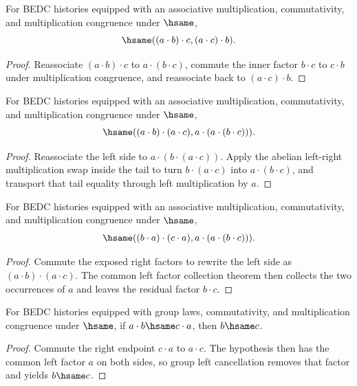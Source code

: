 \begin{theorem}
\label{thm:abgroup-mul-right-factor-swap}
For BEDC histories equipped with an associative multiplication, commutativity,
and multiplication congruence under $\hsame$,
$$
\hsame((a\cdot b)\cdot c,(a\cdot c)\cdot b).
$$
\end{theorem}
\begin{proof}
Reassociate $(a\cdot b)\cdot c$ to $a\cdot(b\cdot c)$, commute the inner
factor $b\cdot c$ to $c\cdot b$ under multiplication congruence, and reassociate
back to $(a\cdot c)\cdot b$.
\end{proof}

\begin{theorem}
\label{thm:abgroup-mul-common-left-factor-collect}
For BEDC histories equipped with an associative multiplication, commutativity,
and multiplication congruence under $\hsame$,
$$
\hsame((a\cdot b)\cdot(a\cdot c),a\cdot(a\cdot(b\cdot c))).
$$
\end{theorem}
\begin{proof}
Reassociate the left side to $a\cdot(b\cdot(a\cdot c))$. Apply the abelian
left-right multiplication swap inside the tail to turn $b\cdot(a\cdot c)$
into $a\cdot(b\cdot c)$, and transport that tail equality through left
multiplication by $a$.
\end{proof}

\begin{theorem}
\label{thm:abgroup-mul-common-right-factor-collect}
For BEDC histories equipped with an associative multiplication, commutativity,
and multiplication congruence under $\hsame$,
$$
\hsame((b\cdot a)\cdot(c\cdot a),a\cdot(a\cdot(b\cdot c))).
$$
\end{theorem}
\begin{proof}
Commute the exposed right factors to rewrite the left side as
\((a\cdot b)\cdot(a\cdot c)\). The common left factor collection theorem then
collects the two occurrences of \(a\) and leaves the residual factor
\(b\cdot c\).
\end{proof}

\begin{theorem}
\label{thm:abgroup-mul-balanced-cancel}
For BEDC histories equipped with group laws, commutativity, and multiplication
congruence under $\hsame$, if $a\cdot b\hsame c\cdot a$, then $b\hsame c$.
\end{theorem}
\begin{proof}
Commute the right endpoint $c\cdot a$ to $a\cdot c$. The hypothesis then has
the common left factor $a$ on both sides, so group left cancellation removes
that factor and yields $b\hsame c$.
\end{proof}

